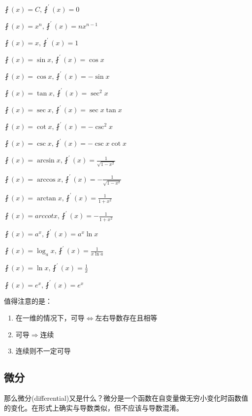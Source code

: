 \documentclass[UTF8]{ctexbook}
\newcommand{\derivative}{^\prime}
\newcommand{\myLeftRightArrow}{$\Leftrightarrow$}
\newcommand{\myRightArrow}{$\Rightarrow$}
\begin{document}
{{{{{      $\fint(x) = C, \fint\derivative(x) = 0$

      $\fint(x) = x^n, \fint\derivative(x) = nx^{n-1}$

      $\fint(x) = x, \fint\derivative(x) = 1$

      $\fint(x) = \sin x, \fint\derivative(x) = \cos x$

      $\fint(x) = \cos x, \fint\derivative(x) = -\sin x$

      $\fint(x) = \tan x, \fint\derivative(x) = \sec^2 x$

      $\fint(x) = \sec x, \fint\derivative(x) = \sec x\tan x$

      $\fint(x) = \cot x, \fint\derivative(x) = -\csc^2 x$

      $\fint(x) = \csc x, \fint\derivative(x) = -\csc x\cot x$

      $\fint(x) = \arcsin x, \fint\derivative(x) = \frac{1}{\sqrt{1 - x^2}}$

      $\fint(x) = \arccos x, \fint\derivative(x) = -\frac{1}{\sqrt{1 - x^2}}$

      $\fint(x) = \arctan x, \fint\derivative(x) = \frac{1}{1 + x^2}$

      $\fint(x) = arccotx, \fint\derivative(x) = -\frac{1}{1 + x^2}$

      $\fint(x) = a^x, \fint\derivative(x) = a^x\ln x$

      $\fint(x) = \log_a x, \fint\derivative(x) = \frac{1}{x\ln a}$

      $\fint(x) = \ln x, \fint\derivative(x)= \frac{1}{x}$

      $\fint(x) = e^x, \fint\derivative(x) = e^x$
    }
    \newline

    值得注意的是：
    \begin{enumerate}
      \item 在一维的情况下，可导\myLeftRightArrow 左右导数存在且相等

      \item 可导\myRightArrow 连续

      \item 连续则不一定可导
    \end{enumerate}
  }

  \subsection{微分}{
    那么微分(differential)又是什么？微分是一个函数在自变量做无穷小变化时函数值的变化。在形式上确实与导数类似，但不应该与导数混淆。

}}}}
\end{document}
